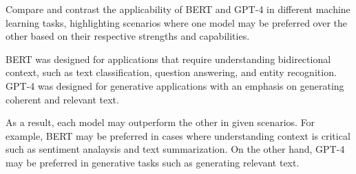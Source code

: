 Compare and contrast the applicability of BERT and GPT-4 in different machine learning tasks, highlighting scenarios where one model may be preferred over the other based on their respective strengths and capabilities.

\begin{tcolorbox}
BERT was designed for applications that require understanding bidirectional context, such as text classification, question answering, and entity recognition. GPT-4 was designed for generative applications with an emphasis on generating coherent and relevant text. 

\vspace{2mm}

As a result, each model may outperform the other in given scenarios. For example, BERT may be preferred in cases where understanding context is critical such as sentiment analaysis and text summarization. On the other hand, GPT-4 may be preferred in generative tasks such as generating relevant text.

\end{tcolorbox}
